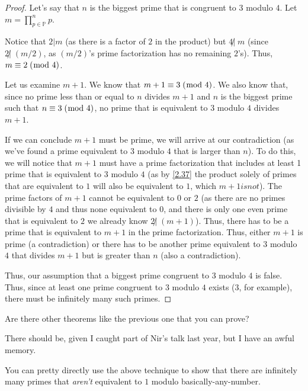 \documentclass[../main.tex]{subfiles}
\begin{document}
\begin{proof}
  Let's say that $n$ is the biggest prime that is congruent to $3$ modulo $4$. Let $m = \prod_{p \in \mathbb{P}}^{n} p$.

  Notice that $2 | m$ (as there is a factor of $2$ in the product) but $4 \not | \; m$ (since $2 \not | \; (m/2)$, as $(m/2)$'s prime factorization has no remaining $2$'s). Thus, $m \equiv 2 \; (\bmod \; 4)$.

  Let us examine $m+1$. We know that $m + 1 \equiv 3 \; (\bmod \; 4)$. We also know that, since no prime less than or equal to $n$ divides $m+1$ and $n$ is the biggest prime such that $n \equiv 3 \; (\bmod \; 4)$, no prime that is equivalent to $3$ modulo $4$ divides $m+1$.

  If we can conclude $m+1$ must be prime, we will arrive at our contradiction (as we've found a prime equivalent to $3$ modulo $4$ that is larger than $n$). To do this, we will notice that $m+1$ must have a prime factorization that includes at least 1 prime that is equivalent to $3$ modulo $4$ (as by \ref{2.37} the product solely of primes that are equivalent to $1$ will also be equivalent to $1$, which $m+1 is not$). The prime factors of $m+1$ cannot be equivalent to $0$ or $2$ (as there are no primes divisible by $4$ and thus none equivalent to $0$, and there is only one even prime that is equivalent to $2$ we already know $2 \not | \; (m+1)$). Thus, there has to be a prime that is equivalent to $m+1$ in the prime factorization.
  Thus, either $m+1$ is prime (a contradiction) or there has to be another prime equivalent to $3$ modulo $4$ that divides $m+1$ but is greater than $n$ (also a contradiction).

  Thus, our assumption that a biggest prime congruent to $3$ modulo $4$ is false. Thus, since at least one prime congruent to $3$ modulo $4$ exists ($3$, for example), there must be infinitely many such primes.
\end{proof}



\pagebreak



\begin{ques} \label{2.39}
  Are there other theorems like the previous one that you can prove?
\end{ques}

There should be, given I caught part of Nir's talk last year, but I have an awful memory.

You can pretty directly use the above technique to show that there are infinitely many primes that \emph{aren't} equivalent to $1$ modulo basically-any-number.
\end{document}
